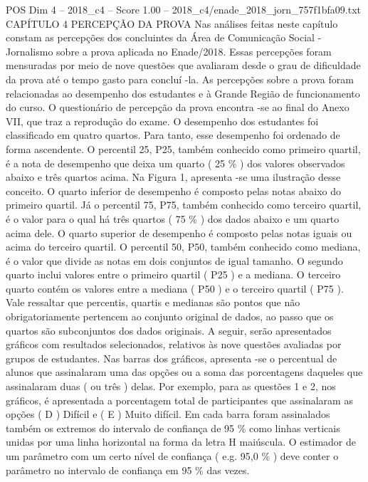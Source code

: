 \begin{textsample}{POS Dim 4 – 2018\_c4 – Score 1.00 – 2018\_c4/enade\_2018\_jorn\_757f1bfa09.txt}  \label{ex:f4_pos_186}
CAPÍTULO 4 PERCEPÇÃO DA PROVA Nas análises feitas neste capítulo constam as percepções dos concluintes da Área de Comunicação Social - Jornalismo sobre a prova aplicada no Enade/2018.
Essas percepções foram mensuradas por meio de nove questões que avaliaram desde o grau de dificuldade da prova até o tempo gasto para concluí -la.
As percepções sobre a prova foram relacionadas ao desempenho dos estudantes e à Grande Região de funcionamento do curso.
O questionário de percepção da prova encontra -se ao final do Anexo VII, que traz a reprodução do exame.
O desempenho dos estudantes foi classificado em quatro quartos.
Para tanto, esse desempenho foi ordenado de forma ascendente.
O percentil 25, P25, também conhecido como primeiro quartil, é a nota de desempenho que deixa um quarto ( 25 \% ) dos valores observados abaixo e três quartos acima.
Na Figura 1, apresenta -se uma ilustração desse conceito.
O quarto inferior de desempenho é composto pelas notas abaixo do primeiro quartil.
Já o percentil 75, P75, também conhecido como terceiro quartil, é o valor para o qual há três quartos ( 75 \% ) dos dados abaixo e um quarto acima dele.
O quarto superior de desempenho é composto pelas notas iguais ou acima do terceiro quartil.
O percentil 50, P50, também conhecido como mediana, é o valor que divide as notas em dois conjuntos de igual tamanho.
O segundo quarto inclui valores entre o primeiro quartil ( P25 ) e a mediana.
O terceiro quarto contém os valores entre a mediana ( P50 ) e o terceiro quartil ( P75 ).
Vale ressaltar que percentis, quartis e medianas são pontos que não obrigatoriamente pertencem ao conjunto original de dados, ao passo que os quartos são subconjuntos dos dados originais.
A seguir, serão apresentados gráficos com resultados selecionados, relativos às nove questões avaliadas por grupos de estudantes.
Nas barras dos gráficos, apresenta -se o percentual de alunos que assinalaram uma das opções ou a soma das porcentagens daqueles que assinalaram duas ( ou três ) delas.
Por exemplo, para as questões 1 e 2, nos gráficos, é apresentada a porcentagem total de participantes que assinalaram as opções ( D ) Difícil e ( E ) Muito difícil.
Em cada barra foram assinalados também os extremos do intervalo de confiança de 95 \% como linhas verticais unidas por uma linha horizontal na forma da letra H maiúscula.
O estimador de um parâmetro com um certo nível de confiança ( e.g. 95,0 \% ) deve conter o parâmetro no intervalo de confiança em 95 \% das vezes.

\end{textsample}
